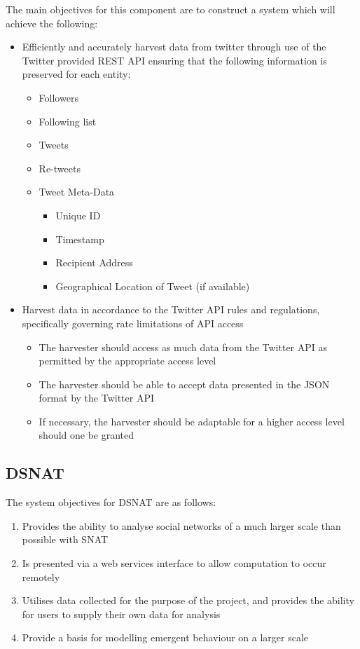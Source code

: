 The main objectives for this component are to construct a system which will achieve the following:

\begin{itemize}
\item Efficiently and accurately harvest data from twitter through use of the Twitter provided
 REST API ensuring that the following information is preserved for each entity:
\begin{itemize}
\item Followers
\item Following list
\item Tweets
\item Re-tweets
\item Tweet Meta-Data
\begin{itemize}
	\item Unique ID
\item Timestamp
\item Recipient Address
\item Geographical Location of Tweet (if available)
\end{itemize}
\end{itemize}
\item Harvest data in accordance to the Twitter API rules and regulations, specifically governing rate limitations of API access
\begin{itemize}
\item The harvester should access as much data from the Twitter API as permitted by the appropriate access level
\item The harvester should be able to accept data presented in the JSON format by the Twitter API
\item If necessary, the harvester should be adaptable for a higher access level should one be granted
\end{itemize}
\end{itemize}


\subsection{DSNAT}

The system objectives for DSNAT are as follows:

\begin{enumerate}
  \item Provides the ability to analyse social networks of a much larger scale than possible with SNAT
  \item Is presented via a web services interface to allow computation to occur remotely
  \item Utilises data collected for the purpose of the project, and provides the ability for users to supply their own data for analysis
  \item Provide a basis for modelling emergent behaviour on a larger scale
\end{enumerate}

